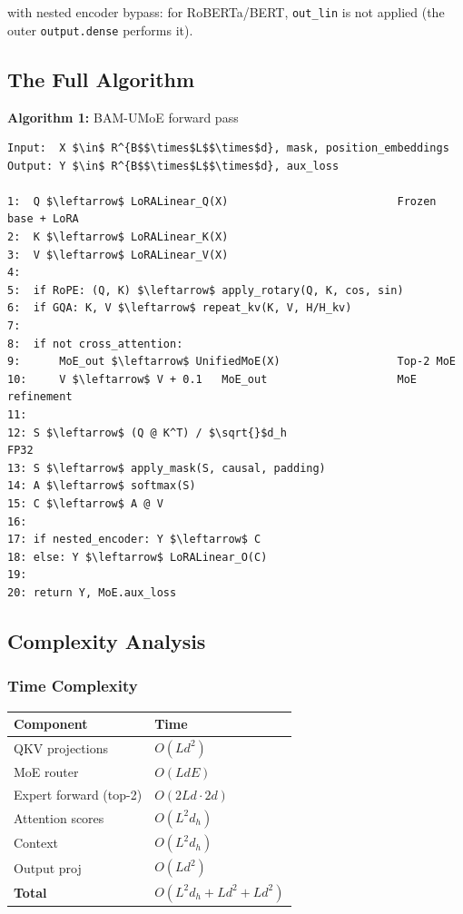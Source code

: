 with nested encoder bypass: for RoBERTa/BERT, \texttt{out\_lin} is not applied 
(the outer \texttt{output.dense} performs it).

\subsection{The Full Algorithm}

\textbf{Algorithm 1:} BAM-UMoE forward pass
\begin{lstlisting}
Input:  X $\in$ R^{B$$\times$L$$\times$d}, mask, position_embeddings
Output: Y $\in$ R^{B$$\times$L$$\times$d}, aux_loss

1:  Q $\leftarrow$ LoRALinear_Q(X)                          Frozen base + LoRA
2:  K $\leftarrow$ LoRALinear_K(X)
3:  V $\leftarrow$ LoRALinear_V(X)
4:
5:  if RoPE: (Q, K) $\leftarrow$ apply_rotary(Q, K, cos, sin)
6:  if GQA: K, V $\leftarrow$ repeat_kv(K, V, H/H_kv)
7:
8:  if not cross_attention:
9:      MoE_out $\leftarrow$ UnifiedMoE(X)                  Top-2 MoE
10:     V $\leftarrow$ V + 0.1   MoE_out                    MoE refinement
11:
12: S $\leftarrow$ (Q @ K^T) / $\sqrt{}$d_h                         FP32
13: S $\leftarrow$ apply_mask(S, causal, padding)
14: A $\leftarrow$ softmax(S)
15: C $\leftarrow$ A @ V
16:
17: if nested_encoder: Y $\leftarrow$ C
18: else: Y $\leftarrow$ LoRALinear_O(C)
19:
20: return Y, MoE.aux_loss
\end{lstlisting}

\subsection{Complexity Analysis}

\subsubsection{Time Complexity}

\begin{table}[H]
\centering
\small
\begin{tabular}{ll}
\toprule
\textbf{Component} & \textbf{Time} \\
\midrule
QKV projections & $O(L d^2)$ \\
MoE router & $O(L d E)$ \\
Expert forward (top-2) & $O(2 L d \cdot 2 d)$ \\
Attention scores & $O(L^2 d_h)$ \\
Context & $O(L^2 d_h)$ \\
Output proj & $O(L d^2)$ \\
\textbf{Total} & $O(L^2 d_h + L d^2 + L d^2)$ \\
\bottomrule
\end{tabular}
\end{table}

